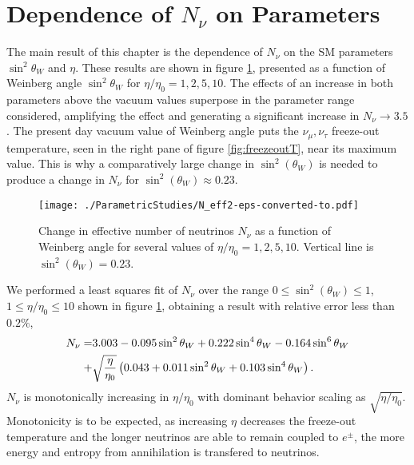 \section{Dependence of $N_\nu$ on Parameters}\label{sec:param_char}

The main result  of this chapter is the  dependence of $N_\nu$ on  the SM parameters   $\sin^2\theta_W$ and $\eta$. These results are shown in  figure \ref{N_nu_params}, presented as a function of  Weinberg angle $\sin^2 \theta_W $ for $\eta/\eta_0=1,2,5,10$. The effects of an increase in both parameters above the vacuum values superpose  in the parameter range  considered, amplifying the effect and generating a significant increase in  $N_\nu\to 3.5$. The present day vacuum value of Weinberg angle puts the $\nu_\mu,\nu_\tau$ freeze-out temperature, seen in the right pane of figure \ref{fig:freezeoutT},  near its maximum value.  This is why a comparatively large change in $\sin^2(\theta_W)$ is needed to produce a change in $N_\nu$ for $\sin^2(\theta_W)\approx0.23$.
 
\begin{figure}%
\centerline{\texttt{[image: ./ParametricStudies/N\_eff2-eps-converted-to.pdf]}
}
\caption{Change in effective number of neutrinos  $N_\nu$ as a function of Weinberg angle for  several values of $\eta/\eta_0=1,2,5,10$. Vertical line is $\sin^2(\theta_W)=0.23$.}
\label{N_nu_params}  
 \end{figure}
We performed a least squares fit of $N_\nu$ over the range $0\leq \sin^2(\theta_W)\leq 1$, $1\leq \eta/\eta_0\leq 10$ shown in figure \ref{N_nu_params}, obtaining a result with relative error less than $0.2\%$,
\begin{align}
N_\nu=&3.003-0.095\sin^2\theta_W +0.222\sin^4\theta_W  -0.164\sin^6\theta_W \notag\\
+&\sqrt{\frac{\eta}{\eta_0}}\left(0.043+0.011\sin^2\theta_W +0.103\sin^4\theta_W\right).
\end{align}
$N_\nu$ is monotonically increasing in $\eta/\eta_0$ with dominant behavior  scaling as $\sqrt{ \eta/\eta_0}$. Monotonicity is to be expected, as increasing $\eta$ decreases the freeze-out temperature and the longer neutrinos are able to remain coupled to $e^\pm$, the more energy and entropy from annihilation is transfered to neutrinos.

